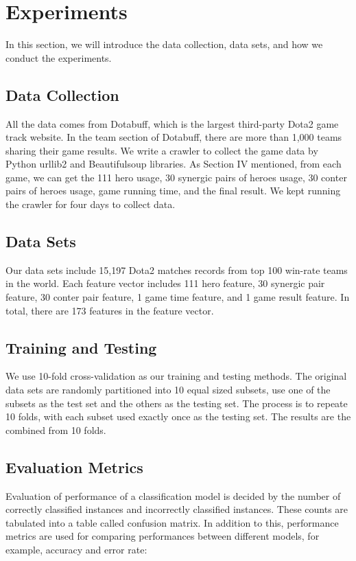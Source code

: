 \section{Experiments}
In this section, we will introduce the data collection, data sets, and how we conduct the experiments.
\subsection{Data Collection}
All the data comes from Dotabuff, which is the largest third-party Dota2 game track website.
In the team section of Dotabuff, there are more than 1,000 teams sharing their game results.
We write a crawler to collect the game data by Python urllib2 and Beautifulsoup libraries.
As Section IV mentioned, from each game, we can get the 111 hero usage, 30 synergic pairs of heroes usage,
30 conter pairs of heroes usage, game running time, and the final result.
We kept running the crawler for four days to collect data.
\subsection{Data Sets}
Our data sets include 15,197 Dota2 matches records from top 100 win-rate teams in the world.
Each feature vector includes 111 hero feature, 30 synergic pair feature, 30 conter pair feature,
1 game time feature, and 1 game result feature.
In total, there are 173 features in the feature vector.

\subsection{Training and Testing}
We use 10-fold cross-validation as our training and testing methods.
The original data sets are randomly partitioned into 10 equal sized subsets, use one of the subsets as the test set and the others as the testing set.
The process is to repeate 10 folds, with each subset used exactly once as the testing set.
The results are the combined from 10 folds.

\subsection{Evaluation Metrics}
Evaluation of performance of a classification model is decided by the number of correctly classified instances and incorrectly classified instances. These counts are tabulated into a table called confusion matrix. In addition to this, performance metrics are used for comparing performances between different models, for example, accuracy and error rate:

